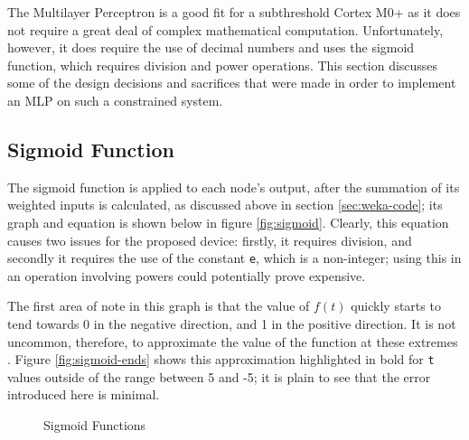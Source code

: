 
The Multilayer Perceptron is a good fit for a subthreshold Cortex M0+ as it does not require a great deal of complex mathematical computation. Unfortunately, however, it does require the use of decimal numbers and uses the sigmoid function, which requires division and power operations. This section discusses some of the design decisions and sacrifices that were made in order to implement an MLP on such a constrained system.

\subsection{Sigmoid Function}
The sigmoid function is applied to each node's output, after the summation of its weighted inputs is calculated, as discussed above in section \ref{sec:weka-code}; its graph and equation is shown below in figure \ref{fig:sigmoid}. Clearly, this equation causes two issues for the proposed device: firstly, it requires division, and secondly it requires the use of the constant \verb|e|, which is a non-integer; using this in an operation involving powers could potentially prove expensive.

The first area of note in this graph is that the value of $f(t)$ quickly starts to tend towards 0 in the negative direction, and 1 in the positive direction. It is not uncommon, therefore, to approximate the value of the function at these extremes \cite{sigmoid_approx}. Figure \ref{fig:sigmoid-ends} shows this approximation highlighted in bold for \verb|t| values outside of the range between 5 and -5; it is plain to see that the error introduced here is minimal.

\begin{figure}
    \centering
    \caption{Sigmoid Functions \label{fig:sigmoid-options}}
\end{figure}

